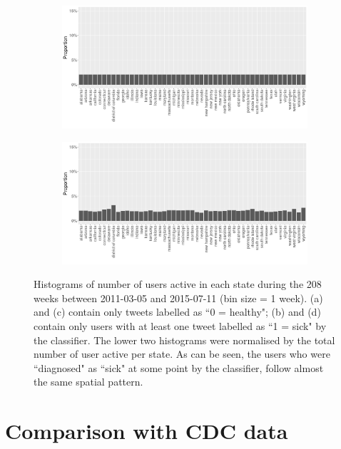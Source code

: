 \documentclass[11pt, a4paper,twoside]{report}\usepackage[]{graphicx}\usepackage[]{color}
\begin{document}
\begin{figure}[H]
    \begin{subfigure}[t]{0.49\textwidth}
  \includegraphics[width=1\linewidth]{activity_rel_healthy_user_statename_Twitter_full_aggregated.png}
  \caption{}
  \end{subfigure}
  \hfill
    \begin{subfigure}[t]{0.49\textwidth}
  \includegraphics[width=1\linewidth]{activity_rel_sick_user_statename_Twitter_full_aggregated.png}
  \caption{}
  \end{subfigure}
  \caption{Histograms of number of users active in each state during the 208 weeks between 2011-03-05 and 2015-07-11 (bin size = 1 week). (a) and (c) contain only tweets labelled as ``0 = healthy"; (b) and (d) contain only users with at least one tweet labelled as ``1 = sick" by the classifier. The lower two histograms were normalised by the total number of user active per state. As can be seen, the users who were ``diagnosed" as ``sick" at some point by the classifier, follow almost the same spatial pattern.}
  \label{fig:tweets_state_healthy_sick_user}
\end{figure}

\section{Comparison with CDC data}
\label{sec:comp_cdc}
\end{document}
